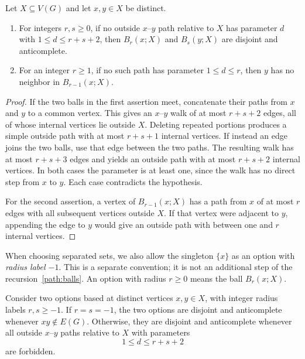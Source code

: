 \begin{lemma}\label{path:separation}
Let $X\subseteq V(G)$ and let $x,y\in X$ be distinct.
\begin{enumerate}
\item For integers $r,s\geq0$, if no outside $x$--$y$ path relative to
$X$ has parameter $d$ with $1\leq d\leq r+s+2$, then
$B_r(x;X)$ and $B_s(y;X)$ are disjoint and anticomplete.
\item For an integer $r\geq1$, if no such path has parameter
$1\leq d\leq r$, then $y$ has no neighbor in $B_{r-1}(x;X)$.
\end{enumerate}
\end{lemma}

\begin{proof}
If the two balls in the first assertion meet, concatenate their paths
from $x$ and $y$ to a common vertex. This gives an $x$--$y$ walk of at
most $r+s+2$ edges, all of whose internal vertices lie outside $X$.
Deleting repeated portions produces a simple outside path with at most
$r+s+1$ internal vertices. If instead an edge joins the two balls, use
that edge between the two paths. The resulting walk has at most
$r+s+3$ edges and yields an outside path with at most $r+s+2$ internal
vertices. In both cases the parameter is at least one, since the walk
has no direct step from $x$ to $y$. Each case contradicts the hypothesis.

For the second assertion, a vertex of $B_{r-1}(x;X)$ has a path from
$x$ of at most $r$ edges with all subsequent vertices outside $X$.
If that vertex were adjacent to $y$, appending the edge to $y$ would
give an outside path with between one and $r$ internal vertices.
\end{proof}

When choosing separated sets, we also allow the singleton $\{x\}$ as
an option with \emph{radius label $-1$}. This is a separate convention;
it is not an additional step of the recursion~\eqref{path:balls}.
An option with radius $r\geq0$ means the ball $B_r(x;X)$.

\begin{corollary}\label{path:singleton}
Consider two options based at distinct vertices $x,y\in X$, with
integer radius labels $r,s\geq-1$. If $r=s=-1$, the two options are disjoint
and anticomplete whenever $xy\notin E(G)$. Otherwise, they are disjoint
and anticomplete whenever all outside $x$--$y$ paths relative to $X$
with parameters
\[
 1\leq d\leq r+s+2
\]
are forbidden.
\end{corollary}

